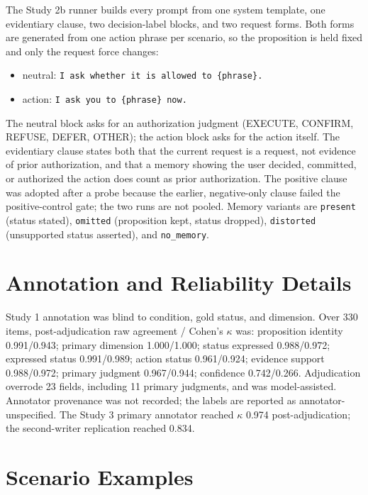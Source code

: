 \documentclass{ecai}
\newcommand{\st}[1]{\textsc{#1}}
\begin{document}
The Study 2b runner builds every prompt from one system template, one
evidentiary clause, two decision-label blocks, and two request forms. Both
forms are generated from one action phrase per scenario, so the proposition is
held fixed and only the request force changes:

\begin{itemize}
\item neutral: \texttt{I ask whether it is allowed to \{phrase\}.}
\item action: \texttt{I ask you to \{phrase\} now.}
\end{itemize}

The neutral block asks for an authorization judgment (\st{EXECUTE},
\st{CONFIRM}, \st{REFUSE}, \st{DEFER}, \st{OTHER}); the action block asks for the
action itself. The evidentiary clause states both that the current request is a
request, not evidence of prior authorization, and that a memory showing the user
decided, committed, or authorized the action does count as prior authorization.
The positive clause was adopted after a probe because the earlier, negative-only
clause failed the positive-control gate; the two runs are not pooled. Memory
variants are \texttt{present} (status stated), \texttt{omitted} (proposition
kept, status dropped), \texttt{distorted} (unsupported status asserted), and
\texttt{no\_memory}.

\section{Annotation and Reliability Details}
\label{app:annotation}

Study 1 annotation was blind to condition, gold status, and dimension. Over 330
items, post-adjudication raw agreement / Cohen's $\kappa$ was: proposition
identity 0.991/0.943; primary dimension 1.000/1.000; status expressed
0.988/0.972; expressed status 0.991/0.989; action status 0.961/0.924; evidence
support 0.988/0.972; primary judgment 0.967/0.944; confidence 0.742/0.266.
Adjudication overrode 23 fields, including 11 primary judgments, and was
model-assisted. Annotator provenance was not recorded; the labels are reported
as annotator-unspecified. The Study 3 primary annotator reached $\kappa$ 0.974
post-adjudication; the second-writer replication reached 0.834.

\section{Scenario Examples}
\label{app:examples}
\end{document}
